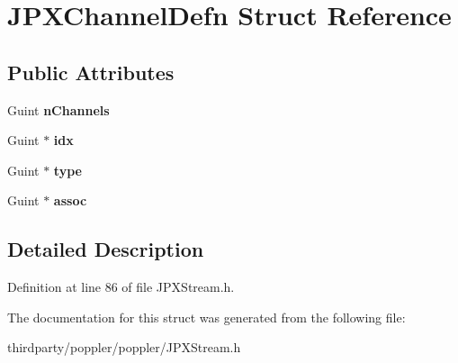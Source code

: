 \hypertarget{struct_j_p_x_channel_defn}{}\section{J\+P\+X\+Channel\+Defn Struct Reference}
\label{struct_j_p_x_channel_defn}
\subsection*{Public Attributes}
\begin{DoxyCompactItemize}
\item 
\mbox{\label{struct_j_p_x_channel_defn_a649f97f5f47022c752b1c896fbd71c83}} 
Guint {\bfseries n\+Channels}
\item 
\mbox{\label{struct_j_p_x_channel_defn_ad0c40357894fd082b0b23a3939ce2743}} 
Guint $\ast$ {\bfseries idx}
\item 
\mbox{\label{struct_j_p_x_channel_defn_ad4b3f977827554b252970a572a50b824}} 
Guint $\ast$ {\bfseries type}
\item 
\mbox{\label{struct_j_p_x_channel_defn_ae141683e01dde61f536521372048f94d}} 
Guint $\ast$ {\bfseries assoc}
\end{DoxyCompactItemize}


\subsection{Detailed Description}


Definition at line 86 of file J\+P\+X\+Stream.\+h.



The documentation for this struct was generated from the following file\+:\begin{DoxyCompactItemize}
\item 
thirdparty/poppler/poppler/J\+P\+X\+Stream.\+h\end{DoxyCompactItemize}
